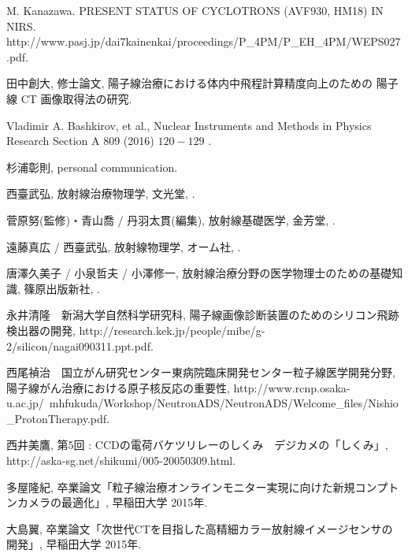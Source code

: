 \begin{bib}[100]
     M. Kanazawa.
     \newblock PRESENT STATUS OF CYCLOTRONS (AVF930, HM18) IN NIRS.
     \newblock http://www.pasj.jp/dai7kainenkai/proceedings/P\_4PM/P\_EH\_4PM/WEPS027.pdf.

     田中創大,
     \newblock 修士論文,
     \newblock 陽子線治療における体内中飛程計算精度向上のための 陽子線 CT 画像取得法の研究.
     
    Vladimir A. Bashkirov, et al.,
     \newblock  Nuclear Instruments and Methods in Physics Research Section A 809 (2016) $120-129$ .
     
杉浦彰則,
    \newblock  personal communication.
     
     西臺武弘,
     \newblock 放射線治療物理学,
     \newblock 文光堂,
     .
     
     菅原努(監修)・青山喬 / 丹羽太貫(編集),
     \newblock 放射線基礎医学,
     \newblock 金芳堂,
     .

     遠藤真広 / 西臺武弘,
     \newblock 放射線物理学,
     \newblock オーム社,
     .     

     唐澤久美子 / 小泉哲夫 / 小澤修一,
     \newblock 放射線治療分野の医学物理士のための基礎知識,
     \newblock 篠原出版新社,
     .
     
    永井清隆　新潟大学自然科学研究科,
     \newblock 陽子線画像診断装置のためのシリコン飛跡検出器の開発,
     \newblock http://research.kek.jp/people/mibe/g-2/silicon/nagai090311.ppt.pdf.
     
    西尾禎治　国立がん研究センター東病院臨床開発センター粒子線医学開発分野,
     \newblock 陽子線がん治療における原子核反応の重要性,
     \newblock http://www.rcnp.osaka-u.ac.jp/~mhfukuda/Workshop/NeutronADS/NeutronADS/Welcome\_files/Nishio\_ProtonTherapy.pdf.
     
    西井美鷹,
     \newblock 第5回 : CCDの電荷バケツリレーのしくみ　デジカメの「しくみ」,
     \newblock http://aska-sg.net/shikumi/005-20050309.html.
     
      多屋隆紀,
     \newblock 卒業論文「粒子線治療オンラインモニター実現に向けた新規コンプトンカメラの最適化」,
     \newblock 早稲田大学 2015年.
     
      大島翼,
     \newblock 卒業論文「次世代CTを目指した高精細カラー放射線イメージセンサの開発」,
     \newblock 早稲田大学 2015年.
     
\end{bib}